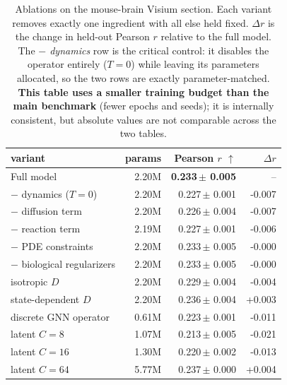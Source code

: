 \begin{table}[htbp]
\centering
\small
\caption{Ablations on the mouse-brain Visium section. Each variant removes exactly one ingredient with all else held fixed. $\Delta r$ is the change in held-out Pearson $r$ relative to the full model. The \emph{$-$ dynamics} row is the critical control: it disables the operator entirely ($T{=}0$) while leaving its parameters allocated, so the two rows are exactly parameter-matched. \textbf{This table uses a smaller training budget than the main benchmark} (fewer epochs and seeds); it is internally consistent, but absolute values are not comparable across the two tables.}
\label{tab:ablations}
\begin{tabular}{lrrr}
\toprule
variant & params & Pearson $r$ $\uparrow$ & $\Delta r$\\
\midrule
Full model & 2.20M & \textbf{0.233\,\tiny{$\pm$ 0.005}} & -- \\
$-$ dynamics ($T{=}0$) & 2.20M & 0.227\,\tiny{$\pm$ 0.001} & -0.007 \\
$-$ diffusion term & 2.20M & 0.226\,\tiny{$\pm$ 0.004} & -0.007 \\
$-$ reaction term & 2.19M & 0.227\,\tiny{$\pm$ 0.001} & -0.006 \\
$-$ PDE constraints & 2.20M & 0.233\,\tiny{$\pm$ 0.005} & -0.000 \\
$-$ biological regularizers & 2.20M & 0.233\,\tiny{$\pm$ 0.005} & -0.000 \\
isotropic $D$ & 2.20M & 0.229\,\tiny{$\pm$ 0.004} & -0.004 \\
state-dependent $D$ & 2.20M & 0.236\,\tiny{$\pm$ 0.004} & +0.003 \\
discrete GNN operator & 0.61M & 0.223\,\tiny{$\pm$ 0.001} & -0.011 \\
\midrule
latent $C{=}8$ & 1.07M & 0.213\,\tiny{$\pm$ 0.005} & -0.021 \\
latent $C{=}16$ & 1.30M & 0.220\,\tiny{$\pm$ 0.002} & -0.013 \\
latent $C{=}64$ & 5.77M & 0.237\,\tiny{$\pm$ 0.000} & +0.004 \\
\bottomrule
\end{tabular}
\end{table}
